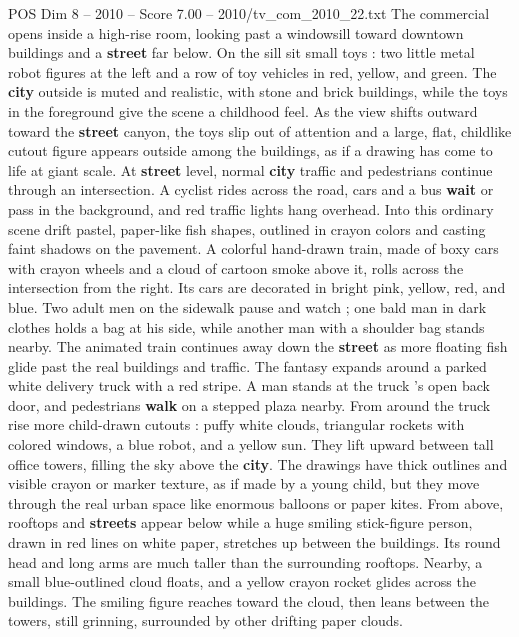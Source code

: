 \begin{textsample}{POS Dim 8 – 2010 – Score 7.00 – 2010/tv\_com\_2010\_22.txt}  \label{ex:f8_pos_028}
The commercial opens inside a high-rise room, looking past a windowsill toward downtown buildings and a \textbf{street} far below.
On the sill sit small toys : two little metal robot figures at the left and a row of toy vehicles in red, yellow, and green.
The \textbf{city} outside is muted and realistic, with stone and brick buildings, while the toys in the foreground give the scene a childhood feel.
As the view shifts outward toward the \textbf{street} canyon, the toys slip out of attention and a large, flat, childlike cutout figure appears outside among the buildings, as if a drawing has come to life at giant scale.
At \textbf{street} level, normal \textbf{city} traffic and pedestrians continue through an intersection.
A cyclist rides across the road, cars and a bus \textbf{wait} or pass in the background, and red traffic lights hang overhead.
Into this ordinary scene drift pastel, paper-like fish shapes, outlined in crayon colors and casting faint shadows on the pavement.
A colorful hand-drawn train, made of boxy cars with crayon wheels and a cloud of cartoon smoke above it, rolls across the intersection from the right.
Its cars are decorated in bright pink, yellow, red, and blue.
Two adult men on the sidewalk pause and watch ; one bald man in dark clothes holds a bag at his side, while another man with a shoulder bag stands nearby.
The animated train continues away down the \textbf{street} as more floating fish glide past the real buildings and traffic.
The fantasy expands around a parked white delivery truck with a red stripe.
A man stands at the truck ’s open back door, and pedestrians \textbf{walk} on a stepped plaza nearby.
From around the truck rise more child-drawn cutouts : puffy white clouds, triangular rockets with colored windows, a blue robot, and a yellow sun.
They lift upward between tall office towers, filling the sky above the \textbf{city}.
The drawings have thick outlines and visible crayon or marker texture, as if made by a young child, but they move through the real urban space like enormous balloons or paper kites.
From above, rooftops and \textbf{streets} appear below while a huge smiling stick-figure person, drawn in red lines on white paper, stretches up between the buildings.
Its round head and long arms are much taller than the surrounding rooftops.
Nearby, a small blue-outlined cloud floats, and a yellow crayon rocket glides across the buildings.
The smiling figure reaches toward the cloud, then leans between the towers, still grinning, surrounded by other drifting paper clouds.

\end{textsample}
